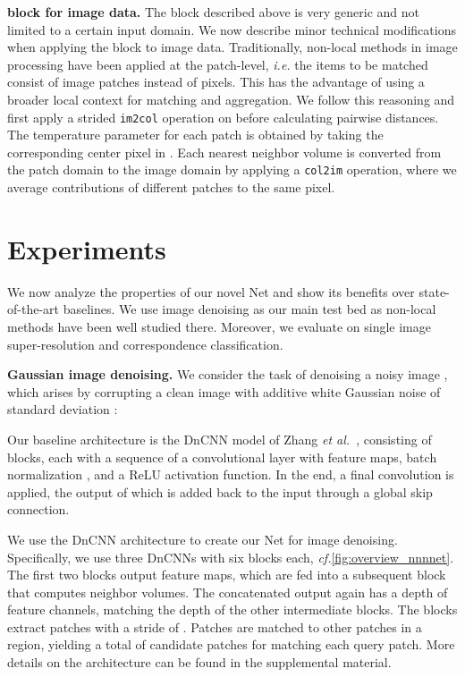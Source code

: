 \documentclass{article}
\makeatletter
\newcommand{\ie}{\emph{i.\thinspace{}e.}\@\xspace}
\newcommand{\cf}{\emph{cf.}\@\xspace}
\newcommand{\etal}{\emph{et al.}\@\xspace}
\newcommand{\myparagraph}[1]{\smallskip\noindent\textbf{#1}}
\makeatother
\begin{document}
\myparagraph{ block for image data.}
The  block described above is very generic and not limited to a certain input domain. 
We now describe minor technical modifications when applying the  block to image data. 
Traditionally, non-local methods in image processing have been applied at the patch-level, \ie the items to be matched consist of image patches instead of pixels. 
This has the advantage of using a broader local context for matching and aggregation.
We follow this reasoning and first apply a strided \texttt{im2col} operation on  before calculating pairwise distances.
The temperature parameter for each patch is obtained by taking the corresponding center pixel in .
Each nearest neighbor volume  is converted from the patch domain to the image domain by applying a \texttt{col2im} operation, where we average contributions of different patches to the same pixel.

 
\section{Experiments}
\label{sec:experiments}
We now analyze the properties of our novel Net and show its benefits over state-of-the-art baselines.
We use image denoising as our main test bed as non-local methods have been well studied there.
Moreover, we evaluate on single image super-resolution and correspondence classification.

\myparagraph{Gaussian image denoising.}
We consider the task of denoising a noisy image , which arises
by corrupting a clean image  with additive white Gaussian noise of standard deviation :

Our baseline architecture is the DnCNN model of Zhang \etal~\cite{Zhang:2017:BGD},
consisting of  blocks, each with a sequence of a  convolutional layer with  feature maps, batch normalization \cite{Ioffe:2015:BNA}, and a ReLU activation function.
In the end, a final  convolution is applied, the output of which is 
added back to the input through a global skip connection.

We use the DnCNN architecture to create our Net for image denoising.
Specifically, we use three DnCNNs with six blocks each, \cf \cref{fig:overview_nnnnet}. 
The first two blocks output  feature maps, which are fed into a subsequent  block that computes  neighbor volumes.
The concatenated output again has a depth of  feature channels, matching the depth of the other intermediate blocks.
The  blocks extract  patches with a stride of .
Patches are matched to other patches in a  region, yielding a total of  candidate patches for matching each query patch. More details on the architecture can be found in the supplemental material.
\end{document}
